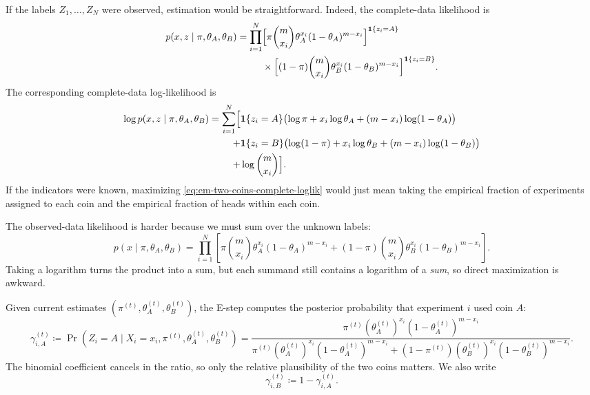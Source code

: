 If the labels $Z_1,\dots,Z_N$ were observed, estimation would be straightforward.
Indeed, the complete-data likelihood is
\begin{align}
  p(x,z\mid \pi,\theta_A,\theta_B)
  =
  \prod_{i=1}^N
  &\Bigl[
    \pi \binom{m}{x_i}\theta_A^{x_i}(1-\theta_A)^{m-x_i}
  \Bigr]^{\mathbf{1}\{z_i=A\}}
  \nonumber\\
  &\times
  \Bigl[
    (1-\pi)\binom{m}{x_i}\theta_B^{x_i}(1-\theta_B)^{m-x_i}
  \Bigr]^{\mathbf{1}\{z_i=B\}}.
  \label{eq:em-two-coins-complete}
\end{align}
The corresponding complete-data log-likelihood is
\begin{align}
  \log p(x,z\mid \pi,\theta_A,\theta_B)
  =
  \sum_{i=1}^N
  \Bigl[
    &\mathbf{1}\{z_i=A\}\bigl(\log \pi + x_i\log \theta_A + (m-x_i)\log(1-\theta_A)\bigr)
    \nonumber\\
    +
    &\mathbf{1}\{z_i=B\}\bigl(\log(1-\pi) + x_i\log \theta_B + (m-x_i)\log(1-\theta_B)\bigr)
    \nonumber\\
    +
    &\log \binom{m}{x_i}
  \Bigr].
  \label{eq:em-two-coins-complete-loglik}
\end{align}
If the indicators were known, maximizing \eqref{eq:em-two-coins-complete-loglik} would just mean taking the empirical fraction of experiments assigned to each coin and the empirical fraction of heads within each coin.

The observed-data likelihood is harder because we must sum over the unknown labels:
\begin{equation}
  p(x\mid \pi,\theta_A,\theta_B)
  =
  \prod_{i=1}^N
  \left[
    \pi \binom{m}{x_i}\theta_A^{x_i}(1-\theta_A)^{m-x_i}
    +
    (1-\pi)\binom{m}{x_i}\theta_B^{x_i}(1-\theta_B)^{m-x_i}
  \right].
  \label{eq:em-two-coins-observed-likelihood}
\end{equation}
Taking a logarithm turns the product into a sum, but each summand still contains a logarithm of a \emph{sum}, so direct maximization is awkward.

Given current estimates $(\pi^{(t)},\theta_A^{(t)},\theta_B^{(t)})$, the E-step computes the posterior probability that experiment $i$ used coin $A$:
\begin{equation}
  \gamma_{i,A}^{(t)}
  \coloneqq
  \Pr(Z_i=A\mid X_i=x_i,\pi^{(t)},\theta_A^{(t)},\theta_B^{(t)})
  =
  \frac{
    \pi^{(t)} (\theta_A^{(t)})^{x_i}(1-\theta_A^{(t)})^{m-x_i}
  }{
    \pi^{(t)} (\theta_A^{(t)})^{x_i}(1-\theta_A^{(t)})^{m-x_i}
    +
    (1-\pi^{(t)}) (\theta_B^{(t)})^{x_i}(1-\theta_B^{(t)})^{m-x_i}
  }.
  \label{eq:em-two-coins-responsibility}
\end{equation}
The binomial coefficient cancels in the ratio, so only the relative plausibility of the two coins matters.
We also write
\[
  \gamma_{i,B}^{(t)} \coloneqq 1-\gamma_{i,A}^{(t)}.
\]

